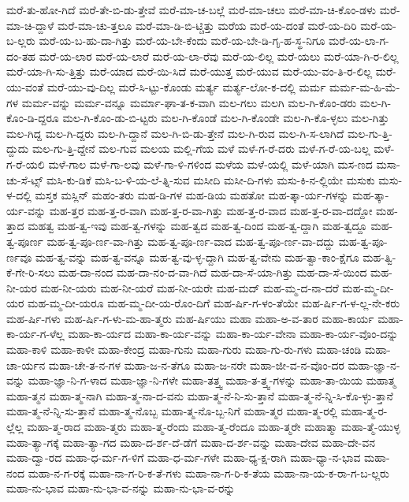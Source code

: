 {ಮರೆ-ತು-ಹೋ-ಗಿದೆ
ಮರೆ-ತೇ-ಬಿ-ಡು-ತ್ತೇವೆ
ಮರೆ-ಮಾ-ಚ-ಬಲ್ಲೆ
ಮರೆ-ಮಾ-ಚಲು
ಮರೆ-ಮಾ-ಚಿ-ಕೊಂ-ಡಳು
ಮರೆ-ಮಾ-ಚಿ-ದ್ದಾಳೆ
ಮರೆ-ಮಾ-ಚು-ತ್ತಲೂ
ಮರೆ-ಮಾ-ಡಿ-ಬಿ-ಟ್ಚಿತ್ತು
ಮರೆಯ
ಮರೆ-ಯ-ದಂತೆ
ಮರೆ-ಯ-ದಿರಿ
ಮರೆ-ಯ-ಬ-ಲ್ಲರು
ಮರೆ-ಯ-ಬ-ಹು-ದಾ-ಗಿತ್ತು
ಮರೆ-ಯ-ಬೇ-ಕೆಂದು
ಮರೆ-ಯ-ಬೇ-ಡಿ-ಗೃ-ಹ-ಸ್ಥ-ನಿಗೂ
ಮರೆ-ಯ-ಲಾ-ಗ-ದಂ-ತಹ
ಮರೆ-ಯ-ಲಾರ
ಮರೆ-ಯ-ಲಾರೆ
ಮರೆ-ಯ-ಲಾ-ರೆವು
ಮರೆ-ಯ-ಲಿಲ್ಲ
ಮರೆ-ಯಲು
ಮರೆ-ಯಾ-ಗಿ-ರ-ಲಿಲ್ಲ
ಮರೆ-ಯಾ-ಗಿ-ಸು-ತ್ತಿತ್ತು
ಮರೆ-ಯಾದ
ಮರೆ-ಯಿ-ಸಿದೆ
ಮರೆ-ಯುತ್ತ
ಮರೆ-ಯುವ
ಮರೆ-ಯು-ವಂ-ತಿ-ರ-ಲಿಲ್ಲ
ಮರೆ-ಯು-ವಂತೆ
ಮರೆ-ಯು-ವು-ದಿಲ್ಲ
ಮರೆ-ಸಿ-ಟ್ಟು-ಕೊಂಡು
ಮರ್ತ್ಯ
ಮರ್ತ್ಯ-ಲೋ-ಕ-ದಲ್ಲಿ
ಮರ್ಮ
ಮರ್ಮ-ಮ-ಹಿ-ಮೆ-ಗಳ
ಮರ್ಮ-ವನ್ನು
ಮರ್ಮ-ವನ್ನೂ
ಮರ್ಮಾ-ಘಾ-ತ-ಕ-ವಾಗಿ
ಮಲ-ಗಲು
ಮಲಗಿ
ಮಲ-ಗಿ-ಕೊಂ-ಡರು
ಮಲ-ಗಿ-ಕೊಂ-ಡಿ-ದ್ದರೂ
ಮಲ-ಗಿ-ಕೊಂ-ಡು-ಬಿ-ಟ್ಟರು
ಮಲ-ಗಿ-ಕೊಂಡೆ
ಮಲ-ಗಿ-ಕೊಂಡೇ
ಮಲ-ಗಿ-ಕೊ-ಳ್ಳಲು
ಮಲ-ಗಿತ್ತು
ಮಲ-ಗಿದ್ದ
ಮಲ-ಗಿ-ದ್ದರು
ಮಲ-ಗಿ-ದ್ದಾನೆ
ಮಲ-ಗಿ-ಬಿ-ಡು-ತ್ತೇನೆ
ಮಲ-ಗಿ-ರುವ
ಮಲ-ಗಿ-ಸ-ಲಾಗಿದೆ
ಮಲ-ಗು-ತ್ತಿ-ದ್ದುದು
ಮಲ-ಗು-ತ್ತಿ-ದ್ದೇನೆ
ಮಲ-ಗುವ
ಮಲಯ
ಮಲ್ಲಿ-ಗೆಯ
ಮಳೆ
ಮಳೆ-ಗ-ರೆ-ದರು
ಮಳೆ-ಗ-ರೆ-ಯ-ಬಲ್ಲ
ಮಳೆ-ಗ-ರೆ-ಯಲಿ
ಮಳೆ-ಗಾಲ
ಮಳೆ-ಗಾ-ಲವು
ಮಳೆ-ಗಾ-ಳಿ-ಗಳಿಂದ
ಮಳೆಯ
ಮಳೆ-ಯಲ್ಲಿ
ಮಳೆ-ಯಾಗಿ
ಮಸ-ಣದ
ಮಸಾ-ಚು-ಸೆ-ಟ್ಸ್
ಮಸಿ-ಕು-ಡಿಕೆ
ಮಸಿ-ಬ-ಳಿ-ಯ-ಲೆ-ತ್ನಿ-ಸುವ
ಮಸೀದಿ
ಮಸೀ-ದಿ-ಗಳು
ಮಸು-ಕಿ-ನ-ಲ್ಲಿಯೇ
ಮಸುಕು
ಮಸು-ಳ-ದಲ್ಲಿ
ಮಸ್ತಕ
ಮಸ್ಲಿನ್
ಮಹಂ-ತರು
ಮಹ-ಡಿ-ಗಳ
ಮಹ-ಡಿಯ
ಮಹತೋ
ಮಹ-ತ್ಕಾ-ರ್ಯ-ಗಳನ್ನು
ಮಹ-ತ್ಕಾ-ರ್ಯ-ವನ್ನು
ಮಹ-ತ್ತರ
ಮಹ-ತ್ತ-ರ-ವಾಗಿ
ಮಹ-ತ್ತ-ರ-ವಾ-ಗಿತ್ತು
ಮಹ-ತ್ತ-ರ-ವಾದ
ಮಹ-ತ್ತ-ರ-ವಾ-ದದ್ದೋ
ಮಹ-ತ್ತಾದ
ಮಹತ್ವ
ಮಹ-ತ್ವ-ಇವು
ಮಹ-ತ್ವ-ಗಳನ್ನು
ಮಹ-ತ್ವದ
ಮಹ-ತ್ವ-ದಿಂದ
ಮಹ-ತ್ವ-ದ್ದಾಗಿ
ಮಹ-ತ್ವದ್ದೂ
ಮಹ-ತ್ವ-ಪೂರ್ಣ
ಮಹ-ತ್ವ-ಪೂ-ರ್ಣ-ವಾ-ಗಿತ್ತು
ಮಹ-ತ್ವ-ಪೂ-ರ್ಣ-ವಾದ
ಮಹ-ತ್ವ-ಪೂ-ರ್ಣ-ವಾ-ದದ್ದು
ಮಹ-ತ್ವ-ಪೂ-ರ್ಣವೂ
ಮಹ-ತ್ವ-ವನ್ನು
ಮಹ-ತ್ವ-ವನ್ನೂ
ಮಹ-ತ್ವ-ವು-ಳ್ಳ-ದ್ದಾಗಿ
ಮಹ-ತ್ವ-ವೇನು
ಮಹ-ತ್ವಾ-ಕಾಂ-ಕ್ಷೆಗೂ
ಮಹ-ತ್ವಿ-ಕೆ-ಗೇ-ರಿ-ಸಲು
ಮಹ-ದಾ-ನಂದ
ಮಹ-ದಾ-ನಂ-ದ-ವಾ-ಗಿದೆ
ಮಹ-ದಾ-ಸೆ-ಯಾ-ಗಿತ್ತು
ಮಹ-ದಾ-ಸೆ-ಯಿಂದ
ಮಹ-ನೀ-ಯರ
ಮಹ-ನೀ-ಯರು
ಮಹ-ನೀ-ಯರೆ
ಮಹ-ನೀ-ಯರೇ
ಮಹ-ಮದ್
ಮಹ-ಮ್ಮ-ದ-ನಾ-ದರೆ
ಮಹ-ಮ್ಮ-ದೀ-ಯರ
ಮಹ-ಮ್ಮ-ದೀ-ಯರೂ
ಮಹ-ಮ್ಮ-ದೀ-ಯ-ರೊಂ-ದಿಗೆ
ಮಹ-ರ್ಷಿ-ಗ-ಳಂ-ತೆಯೇ
ಮಹ-ರ್ಷಿ-ಗ-ಳ-ಲ್ಲ-ನೇ-ಕರು
ಮಹ-ರ್ಷಿ-ಗಳು
ಮಹ-ರ್ಷಿ-ಗ-ಳು-ಮ-ಹಾ-ತ್ಮರು
ಮಹ-ರ್ಷಿಯು
ಮಹಾ
ಮಹಾ-ಅ-ವ-ತಾರ
ಮಹಾ-ಕಾರ್ಯ
ಮಹಾ-ಕಾ-ರ್ಯ-ಗ-ಳೆಲ್ಲ
ಮಹಾ-ಕಾ-ರ್ಯದ
ಮಹಾ-ಕಾ-ರ್ಯ-ವನ್ನು
ಮಹಾ-ಕಾ-ರ್ಯ-ವೇನಾ
ಮಹಾ-ಕಾ-ರ್ಯ-ವೊಂ-ದನ್ನು
ಮಹಾ-ಕಾಳಿ
ಮಹಾ-ಕಾಳೀ
ಮಹಾ-ಕೇಂದ್ರ
ಮಹಾ-ಗುನು
ಮಹಾ-ಗುರು
ಮಹಾ-ಗು-ರು-ಗಳು
ಮಹಾ-ಚಂಡಿ
ಮಹಾ-ಚಾ-ರ್ಯನ
ಮಹಾ-ಚೇ-ತ-ನ-ಗಳ
ಮಹಾ-ಜ-ನ-ತೆಗೂ
ಮಹಾ-ಜ-ನರೇ
ಮಹಾ-ಜೀ-ವ-ನ-ವೊಂ-ದರ
ಮಹಾ-ಜ್ಞಾ-ನ-ವನ್ನು
ಮಹಾ-ಜ್ಞಾ-ನಿ-ಗ-ಳಾದ
ಮಹಾ-ಜ್ಞಾ-ನಿ-ಗಳೇ
ಮಹಾ-ತತ್ತ್ವ
ಮಹಾ-ತ-ತ್ತ್ವ-ಗಳನ್ನು
ಮಹಾ-ತಾ-ಯಿಯ
ಮಹಾತ್ಮ
ಮಹಾ-ತ್ಮನ
ಮಹಾ-ತ್ಮ-ನಾಗಿ
ಮಹಾ-ತ್ಮ-ನಾ-ದ-ವನು
ಮಹಾ-ತ್ಮ-ನೆ-ನಿ-ಸು-ತ್ತಾನೆ
ಮಹಾ-ತ್ಮ-ನೆ-ನ್ನಿ-ಸಿ-ಕೊ-ಳ್ಳು-ತ್ತಾನೆ
ಮಹಾ-ತ್ಮ-ನೆ-ನ್ನಿ-ಸು-ತ್ತಾನೆ
ಮಹಾ-ತ್ಮ-ನೊಬ್ಬ
ಮಹಾ-ತ್ಮ-ನೊ-ಬ್ಬ-ನಿಗೆ
ಮಹಾ-ತ್ಮರ
ಮಹಾ-ತ್ಮ-ರಲ್ಲಿ
ಮಹಾ-ತ್ಮ-ರ-ಲ್ಲೆಲ್ಲ
ಮಹಾ-ತ್ಮ-ರಾದ
ಮಹಾ-ತ್ಮರು
ಮಹಾ-ತ್ಮ-ರೆಂದು
ಮಹಾ-ತ್ಮ-ರೆಂದೂ
ಮಹಾ-ತ್ಮರೇ
ಮಹಾತ್ಮಾ
ಮಹಾ-ತ್ಮೆ-ಯುಳ್ಳ
ಮಹಾ-ತ್ಯಾ-ಗಕ್ಕೆ
ಮಹಾ-ತ್ಯಾ-ಗದ
ಮಹಾ-ದ-ರ್ಶ-ದೆ-ಡೆಗೆ
ಮಹಾ-ದ-ರ್ಶ-ವನ್ನು
ಮಹಾ-ದೇವ
ಮಹಾ-ದೇ-ವನ
ಮಹಾ-ದ್ವಾ-ರದ
ಮಹಾ-ಧ-ರ್ಮ-ಗ-ಳಿಗೆ
ಮಹಾ-ಧ-ರ್ಮ-ಗಳೇ
ಮಹಾ-ಧ್ಯ-ಕ್ಷ-ರಾಗಿ
ಮಹಾ-ಧ್ಯಾ-ನ-ಭಾವ
ಮಹಾ-ನಂದ
ಮಹಾ-ನ-ಗ-ರಕ್ಕೆ
ಮಹಾ-ನಾ-ಗ-ರಿ-ಕ-ತೆ-ಗಳು
ಮಹಾ-ನಾ-ಗ-ರಿ-ಕ-ತೆಯ
ಮಹಾ-ನಾ-ಯ-ಕ-ರಾ-ಗ-ಬ-ಲ್ಲರು
ಮಹಾ-ನು-ಭಾವ
ಮಹಾ-ನು-ಭಾ-ವ-ನನ್ನು
ಮಹಾ-ನು-ಭಾ-ವ-ರನ್ನು
}
